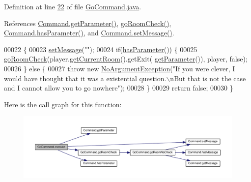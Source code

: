 Definition at line \hyperlink{GoCommand_8java_source_l00022}{22} of file \hyperlink{GoCommand_8java_source}{Go\-Command.\-java}.



References \hyperlink{Command_8java_source_l00025}{Command.\-get\-Parameter()}, \hyperlink{GoCommand_8java_source_l00040}{go\-Room\-Check()}, \hyperlink{Command_8java_source_l00041}{Command.\-has\-Parameter()}, and \hyperlink{Command_8java_source_l00049}{Command.\-set\-Message()}.


\begin{DoxyCode}
00022                                                                                                            
               \{
00023         \hyperlink{classCommand_a715709d8f0ab65879d79ad1725c96f17}{setMessage}(\textcolor{stringliteral}{""});
00024         \textcolor{keywordflow}{if}(\hyperlink{classCommand_a9b042558156d6749566e0fd9d48d3bfe}{hasParameter}()) \{
00025             \hyperlink{classGoCommand_a1fce2ad8ed1faf41fa300064585b3616}{goRoomCheck}(player.\hyperlink{classPlayer_a3a3107df50fc4e35e8c0f46c3f776ce6}{getCurrentRoom}().getExit(
      \hyperlink{classCommand_a1ced3739d546770ba1389e6ce228255e}{getParameter}()), player, \textcolor{keyword}{false});
00026         \} \textcolor{keywordflow}{else} \{
00027             \textcolor{keywordflow}{throw} \textcolor{keyword}{new} \hyperlink{classNoArgumentException}{NoArgumentException}(\textcolor{stringliteral}{"If you were clever, I would have thought that
       it was a existential question.\(\backslash\)nBut that is not the case and I cannot allow you to go nowhere"});
00028         \}
00029         \textcolor{keywordflow}{return} \textcolor{keyword}{false};
00030     \}
\end{DoxyCode}


Here is the call graph for this function\-:
\nopagebreak
\begin{figure}[H]
\begin{center}
\leavevmode
\includegraphics[width=350pt]{classGoCommand_a77a61c2a3b89dca45b51e06f3bcb3ba7_cgraph}
\end{center}
\end{figure}


